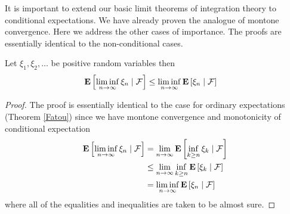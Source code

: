 It is important to extend our basic limit theorems of integration
theory to conditional expectations.  We have already proven the
analogue of montone convergence.  Here we address the other cases of
importance.  The proofs are essentially identical to the
non-conditional cases.
\begin{lem}\label{FatouConditional}Let $\xi_1, \xi_2, \dotsc$ be
  positive random variables then 
\begin{align*}
\cexpectationlong{\mathcal{F}}{\liminf_{n \to \infty} \xi_n} &\leq \liminf_{n \to \infty} \cexpectationlong{\mathcal{F}}{\xi_n}
\end{align*}
\end{lem}
\begin{proof}
The proof is essentially identical to the case for ordinary
expectations (Theorem \ref{Fatou}) since we have montone convergence
and monotonicity of conditional expectation
\begin{align*}
\cexpectationlong{\mathcal{F}}{\liminf_{n \to \infty} \xi_n} &=
\lim_{n  \to \infty}\cexpectationlong{\mathcal{F}}{\inf_{k \geq n} \xi_k} \\
&\leq \lim_{n  \to \infty}\inf_{k \geq n}\cexpectationlong{\mathcal{F}}{ \xi_k} \\
 &= \liminf_{n \to \infty} \cexpectationlong{\mathcal{F}}{\xi_n}
\end{align*}
where all of the equalities and inequalities are taken to be almost sure.
\end{proof}

